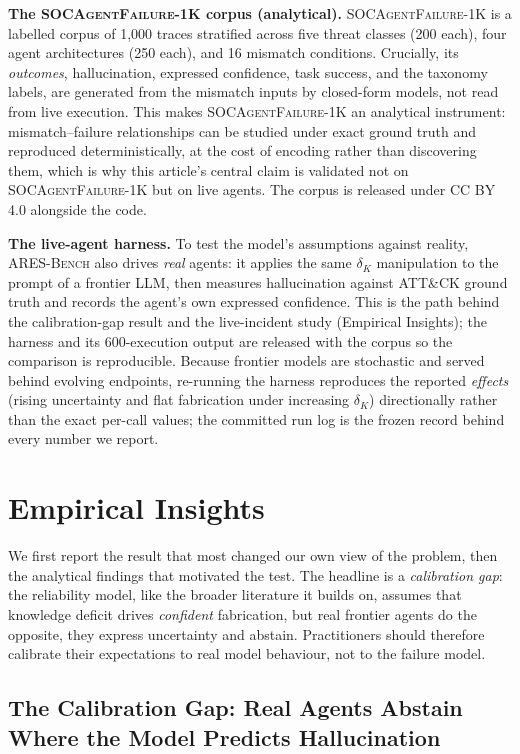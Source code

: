 \documentclass[journal,compsoc]{IEEEtran}
\newcommand{\ARESBench}{\textsc{ARES-Bench}}
\newcommand{\SAFK}{\textsc{SOCAgentFailure-1K}}
\begin{document}
\textbf{The \SAFK{} corpus (analytical).} \SAFK{} is a labelled corpus
of 1{,}000 traces stratified across five threat classes (200 each),
four agent architectures (250 each), and 16 mismatch conditions.
Crucially, its \textit{outcomes}, hallucination, expressed confidence,
task success, and the taxonomy labels, are generated from the mismatch
inputs by closed-form models, not read from live execution. This makes \SAFK{} an analytical instrument: mismatch--failure
relationships can be studied under exact ground truth and reproduced
deterministically, at the cost of encoding rather than discovering
them, which is why this article's central claim is validated not on
\SAFK{} but on live agents. The corpus is released under CC BY 4.0
alongside the code.

\textbf{The live-agent harness.} To test the model's assumptions
against reality, \ARESBench{} also drives \textit{real} agents: it
applies the same $\delta_K$ manipulation to the prompt of a
frontier LLM, then measures hallucination against ATT\&CK ground truth
and records the agent's own expressed confidence. This is the path
behind the calibration-gap result and the live-incident study
(Empirical Insights); the harness and its 600-execution output are
released with the corpus so the comparison is reproducible. Because
frontier models are stochastic and served behind evolving endpoints,
re-running the harness reproduces the reported \textit{effects}
(rising uncertainty and flat fabrication under increasing $\delta_K$)
directionally rather than the exact per-call values; the committed
run log is the frozen record behind every number we report.

\section{Empirical Insights}

We first report the result that most changed our own view of the
problem, then the analytical findings that motivated the test. The
headline is a \textit{calibration gap}: the reliability model, like the
broader literature it builds on, assumes that knowledge deficit drives
\textit{confident} fabrication, but real frontier agents do the
opposite, they express uncertainty and abstain. Practitioners should
therefore calibrate their expectations to real model behaviour, not to
the failure model.

\subsection{The Calibration Gap: Real Agents Abstain Where the Model
Predicts Hallucination}
\end{document}

